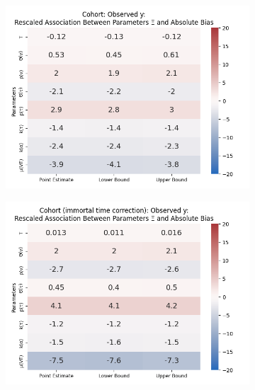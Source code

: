 \documentclass[12pt]{article}
\begin{document}
\begin{figure}[H]
	\begin{subfigure}[t]{0.23\linewidth}
		\centering
		\caption{}
		\includegraphics[scale=0.25]{VEMethod_Drivers1b_FEest_Realistic2_Li_MSpec_Heatmap5.png}
	\end{subfigure}
	\begin{subfigure}[t]{0.23\linewidth}
		\centering
		\caption{}
		\includegraphics[scale=0.25]{VEMethod_Drivers1b_FEest_Realistic2_Li_MSpec_Heatmap6.png}
	\end{subfigure}
	\begin{subfigure}[t]{0.23\linewidth}
		\centering
		\caption{}

\end{subfigure}
\end{figure}
\end{document}
